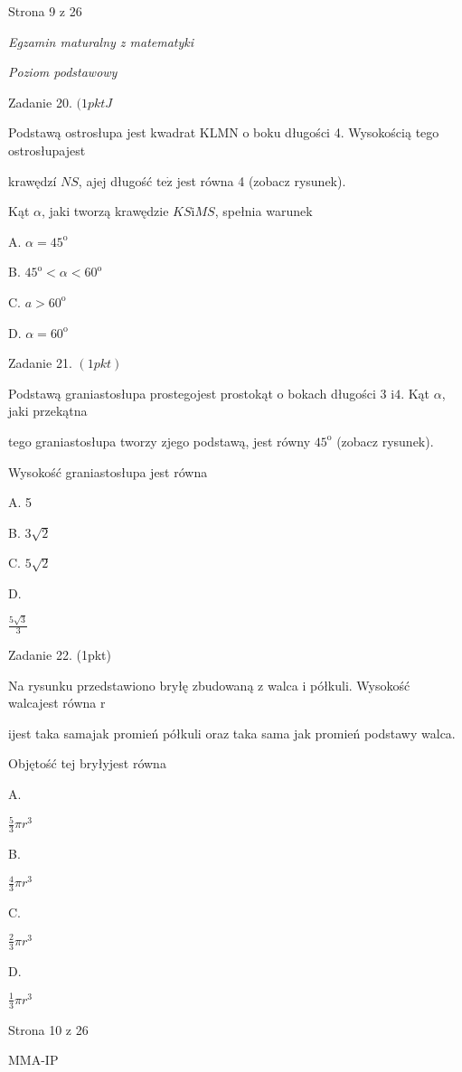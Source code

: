 \documentclass[a4paper,12pt]{article}
\begin{document}
Strona 9 z 26





{\it Egzamin maturalny z matematyki}

{\it Poziom podstawowy}

Zadanie 20. $(1pktJ$

Podstawą ostrosłupa jest kwadrat KLMN o boku długości 4. Wysokością tego ostrosłupajest

krawędzí $NS$, ajej długość $\mathrm{t}\mathrm{e}\dot{\mathrm{z}}$ jest równa 4 (zobacz rysunek).

Kąt $\alpha$, jaki tworzą krawędzie $KS\mathrm{i}MS$, spełnia warunek

A. $\alpha=45^{\mathrm{o}}$

B. $45^{\mathrm{o}}<\alpha<60^{\mathrm{o}}$

C. $a>60^{\mathrm{o}}$

D. $\alpha=60^{\mathrm{o}}$

Zadanie 21. $(1pkt)$

Podstawą graniastosłupa prostegojest prostokąt o bokach długości 3 $\mathrm{i}4$. Kąt $\alpha$, jaki przekątna

tego graniastosłupa tworzy zjego podstawą, jest równy $45^{\mathrm{o}}$ (zobacz rysunek).

Wysokość graniastosłupa jest równa

A. 5

B. $3\sqrt{2}$

C. $5\sqrt{2}$

D.

$\displaystyle \frac{5\sqrt{3}}{3}$

Zadanie 22. (1pkt)

Na rysunku przedstawiono bryłę zbudowaną z walca i półkuli. Wysokość walcajest równa r

ijest taka samajak promień półkuli oraz taka sama jak promień podstawy walca.

Objętość tej bryłyjest równa

A.

$\displaystyle \frac{5}{3}\pi r^{3}$

B.

$\displaystyle \frac{4}{3}\pi r^{3}$

C.

$\displaystyle \frac{2}{3}\pi r^{3}$

D.

$\displaystyle \frac{1}{3}\pi r^{3}$

Strona 10 z 26

MMA-IP
\end{document}
